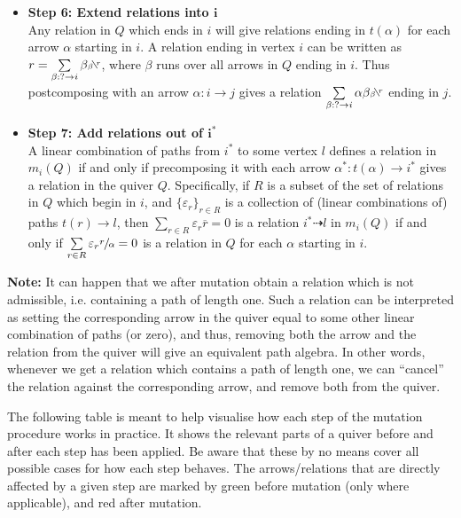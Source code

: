 \documentclass[12pt, dvipsnames, oneside]{amsart}
\theoremstyle{definition}
\newcommand{\bsfrac}[2]{\reflectbox{\sfrac{\text{\reflectbox{$#1$}}}{\text{\reflectbox{$#2$}}}}}
\begin{document}
\begin{itemize}
\item \textbf{Step 6: Extend relations into $\boldsymbol{i}$}\\
Any relation in $Q$ which ends in $i$ will give relations ending in $t(\alpha)$ for each arrow $\alpha$ starting in $i$. A relation ending in vertex $i$ can be written as $r=\sum\limits_{\beta: ?\rightarrow i} \beta\bsfrac{r}{\beta}$, where $\beta$ runs over all arrows in $Q$ ending in $i$. Thus postcomposing with an arrow $\alpha\colon i \rightarrow j$ gives a relation $\sum\limits_{\beta: ?\rightarrow i} \alpha\beta\bsfrac{r}{\beta}$ ending in $j$.\\

\item \textbf{Step 7: Add relations out of $\boldsymbol{i^*}$}\\
A linear combination of paths from $i^*$ to some vertex $l$ defines a relation in $m_i(Q)$ if and only if precomposing it with each arrow ${\alpha^*\colon t(\alpha)\rightarrow i^*}$ gives a relation in the quiver $Q$. Specifically, if $R$ is a subset of the set of relations in $Q$ which begin in $i$, and $\{\varepsilon_r\}_{r\in R}$ is a collection of (linear combinations of) paths $t(r)\rightarrow l$, then $\sum\limits_{r\in R} \varepsilon_r \overline{r}=0$ is a relation $i^*\dashrightarrow l$ in $m_i(Q)$ if and only if $\sum\limits_{r\in R} \varepsilon_r \sfrac{r}{\alpha}=0$ is a relation in $Q$ for each $\alpha$ starting in $i$. %

\end{itemize}

\medskip

\textbf{Note:} It can happen that we after mutation obtain a relation which is not admissible, i.e. containing a path of length one. Such a relation can be interpreted as setting the corresponding arrow in the quiver equal to some other linear combination of paths (or zero), and thus, removing both the arrow and the relation from the quiver will give an equivalent path algebra. 
In other words, whenever we get a relation which contains a path of length one, we can ``cancel'' the relation against the corresponding arrow, and remove both from the quiver.


\vspace{2em}

The following table is meant to help visualise how each step of the mutation procedure works in practice. 
It shows the relevant parts of a quiver before and after each step has been applied.
Be aware that these by no means cover all possible cases for how each step behaves. 
The arrows/relations that are directly affected by a given step are marked by green before mutation (only where applicable), and red after mutation.
\end{document}
